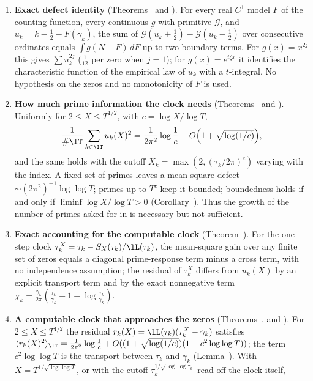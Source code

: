 \begin{enumerate}[label=\textbf{\Alph*.},leftmargin=2.2em]
\item \textbf{Exact defect identity} (Theorems~ and ). For every real $C^1$ model $F$ of the counting function, every continuous $g$ with primitive $\mathcal G$, and $u_k=k-\frac12-F(\gamma_k)$, the sum of $\mathcal G(u_k+\frac12)-\mathcal G(u_k-\frac12)$ over consecutive ordinates equals $\int g(N-F)\,dF$ up to two boundary terms. For $g(x)=x^{2j}$ this gives $\sum u_k^{2j}$ ($\frac1{12}$ per zero when $j=1$); for $g(x)=e^{i\xi x}$ it identifies the characteristic function of the empirical law of $u_k$ with a $t$-integral. No hypothesis on the zeros and no monotonicity of $F$ is used.
\item \textbf{How much prime information the clock needs} (Theorems~ and ). Uniformly for $2\le X\le T^{1/2}$, with $c=\log X/\log T$,
\begin{equation}
 \frac1{\#\IT}\sum_{k\in\IT}u_k(X)^2=\frac1{2\pi^2}\log\frac1c+O\Bigl(1+\sqrt{\log(1/c)}\Bigr),
 \label{eq:intro_main}
\end{equation}
and the same holds with the cutoff $X_k=\max(2,(\tau_k/2\pi)^c)$ varying with the index. A fixed set of primes leaves a mean-square defect $\sim(2\pi^2)^{-1}\log\log T$; primes up to $T^c$ keep it bounded; boundedness holds if and only if $\liminf\log X/\log T>0$ (Corollary~). Thus the growth of the number of primes asked for in \cite{LeClair2021} is necessary but not sufficient.
\item \textbf{Exact accounting for the computable clock} (Theorem~). For the one-step clock $\tau_k^X=\tau_k-S_X(\tau_k)/\lL(\tau_k)$, the mean-square gain over any finite set of zeros equals a diagonal prime-response term minus a cross term, with no independence assumption; the residual of $\tau_k^X$ differs from $u_k(X)$ by an explicit transport term and by the exact nonnegative term $\chi_k=\frac{\gamma_k}{2\pi}(\frac{\tau_k}{\gamma_k}-1-\log\frac{\tau_k}{\gamma_k})$.
\item \textbf{A computable clock that approaches the zeros} (Theorems~,  and ). For $2\le X\le T^{1/2}$ the residual $r_k(X)=\lL(\tau_k)(\tau_k^X-\gamma_k)$ satisfies $\langle r_k(X)^2\rangle_{\IT}=\frac1{2\pi^2}\log\frac1c+O((1+\sqrt{\log(1/c)})(1+c^2\log\log T))$; the term $c^2\log\log T$ is the transport between $\tau_k$ and $\gamma_k$ (Lemma~). With $X=T^{1/\sqrt{\log\log T}}$, or with the cutoff $\tau_k^{1/\sqrt{\log\log\tau_k}}$ read off the clock itself,

\end{enumerate}
